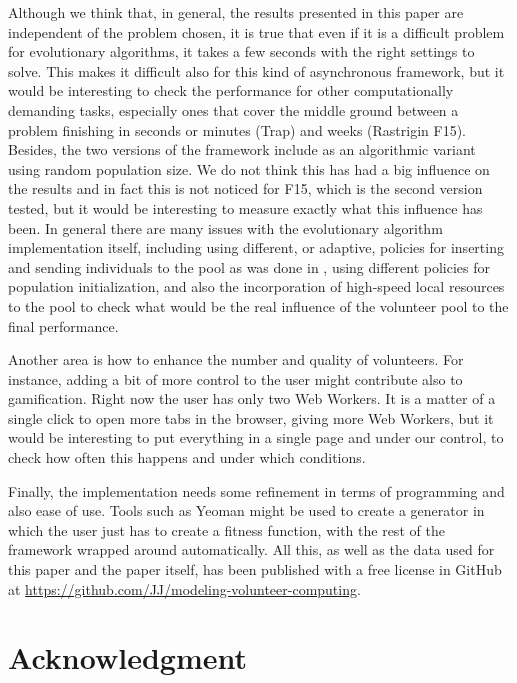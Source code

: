 \documentclass[journal,onecolumn]{IEEEtran}
\begin{document}
Although we think that, in general, the results presented in this
paper are independent of the problem chosen, it is true that even if
it is a difficult problem for evolutionary algorithms, it takes a few
seconds with the right settings to solve. This makes it difficult also
for this kind of asynchronous framework, but it would be interesting
to check the performance for other computationally demanding
tasks, especially ones that cover the middle ground between a problem
finishing in seconds or minutes (Trap) and weeks (Rastrigin F15). 
Besides, the two versions of the framework include as an
algorithmic variant using random population size. We do not think this
has had a big influence on the results and in fact this is not noticed
for F15, which is the second version tested, but it would be interesting to
measure exactly what this influence has been. In general there are
many issues with the evolutionary algorithm implementation itself,
including using different, or adaptive, policies for inserting and
sending individuals to the pool as was done in \cite{araujo2008mam},
using different policies for population initialization, and also the
incorporation of high-speed local resources to the pool to check what
would be the real influence of the volunteer pool to the final
performance. 

Another area is how to enhance the number and quality of
volunteers. For instance, adding a bit of more
control to the user might contribute also to gamification. Right now
the user has only two Web Workers. It is a matter of a single click to
open more tabs in the browser, giving more Web Workers, but it would be
interesting to put everything in a single page and under our control,
to check how often this happens and under which conditions. 

Finally, the implementation needs some refinement in terms of
programming and also ease of use. Tools such as Yeoman might be used %
to create a generator in which the user just has to create a fitness
function, with the rest of the framework wrapped around
automatically. All this, as well as the data used for this paper and the paper
itself, has been published with a free license in GitHub at
\url{https://github.com/JJ/modeling-volunteer-computing}.  

\section*{Acknowledgment}
\end{document}
